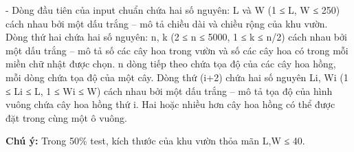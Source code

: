 - Dòng đầu tiên của input chuẩn chứa hai số nguyên: L và W (1 ≤ L, W ≤ 250) cách nhau bởi một dấu trắng – mô tả chiều dài và chiều rộng của khu vườn. Dòng thứ hai chứa hai số nguyên: n, k (2 ≤ n ≤ 5000, 1 ≤ k ≤ n/2) cách nhau bởi một dấu trắng – mô tả số các cây hoa trong vườn và số các cây hoa có trong mỗi miền chữ nhật được chọn. n dòng tiếp theo chứa tọa độ của các cây hoa hồng, mỗi dòng chứa tọa độ của một cây. Dòng thứ (i+2) chứa hai số nguyên Li, Wi (1 ≤ Li ≤ L, 1 ≤ Wi ≤ W) cách nhau bởi một dấu trắng – mô tả tọa độ của hình vuông chứa cây hoa hồng thứ i. Hai hoặc nhiều hơn cây hoa hồng có thể được đặt trong cùng một ô vuông.

\textbf{Chú ý: } Trong 50\% test, kích thước của khu vườn thỏa mãn L,W ≤ 40.

\